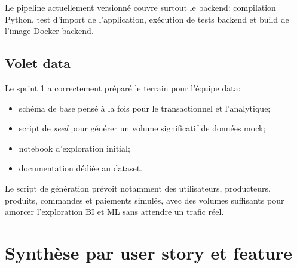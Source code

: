 \documentclass[11pt,a4paper]{article}
\begin{document}
Le pipeline actuellement versionné couvre surtout le backend: compilation Python, test d'import de l'application, exécution de tests backend et build de l'image Docker backend.

\subsection{Volet data}

Le sprint 1 a correctement préparé le terrain pour l'équipe data:

\begin{itemize}[leftmargin=1.5em]
  \item schéma de base pensé à la fois pour le transactionnel et l'analytique;
  \item script de \emph{seed} pour générer un volume significatif de données mock;
  \item notebook d'exploration initial;
  \item documentation dédiée au dataset.
\end{itemize}

Le script de génération prévoit notamment des utilisateurs, producteurs, produits, commandes et paiements simulés, avec des volumes suffisants pour amorcer l'exploration BI et ML sans attendre un trafic réel.

\section{Synthèse par user story et feature}
\end{document}
